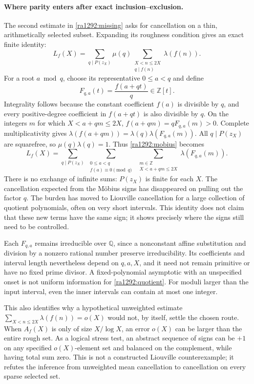 \documentclass[11pt]{article}
\newcommand{\Z}{\mathbb{Z}}
\newcommand{\Q}{\mathbb{Q}}
\begin{document}
\paragraph{Where parity enters after exact inclusion--exclusion.}
The second estimate in \eqref{ra1292:missing} asks for cancellation on a
thin, arithmetically selected subset. Expanding its roughness condition gives
an exact finite identity:
\begin{equation}\label{ra1292:mobius}
 L_f(X)=\sum_{q\mid P(z_X)}\mu(q)
           \sum_{\substack{X<n\le2X\\q\mid f(n)}}\lambda(f(n)).
\end{equation}
For a root $a\bmod q$, choose its representative $0\le a<q$ and define
\[
 F_{q,a}(t)=\frac{f(a+qt)}q\in\Z[t].
\]
Integrality follows because the constant coefficient $f(a)$ is divisible by
$q$, and every positive-degree coefficient in $f(a+qt)$ is also divisible
by $q$. On the integers $m$ for which $X<a+qm\le2X$,
$f(a+qm)=qF_{q,a}(m)>0$. Complete multiplicativity gives
$\lambda(f(a+qm))=\lambda(q)\lambda(F_{q,a}(m))$.
All $q\mid P(z_X)$ are squarefree, so $\mu(q)\lambda(q)=1$.
Thus \eqref{ra1292:mobius} becomes
\begin{equation}\label{ra1292:quotient}
 L_f(X)=
 \sum_{q\mid P(z_X)}
 \ \sum_{\substack{0\le a<q\\ f(a)\equiv0\pmod q}}
 \ \sum_{\substack{m\in\Z\\X<a+qm\le2X}}
        \lambda(F_{q,a}(m)).
\end{equation}
There is no exchange of infinite sums: $P(z_X)$ is finite for each $X$.
The cancellation expected from the M\"obius signs has disappeared on pulling
out the factor $q$. The burden has moved to Liouville cancellation for a
large collection of quotient polynomials, often on very short intervals.
This identity does not claim that these new terms have the same sign; it
shows precisely where the signs still need to be controlled.

Each $F_{q,a}$ remains irreducible over $\Q$, since a nonconstant affine
substitution and division by a nonzero rational number preserve
irreducibility. Its coefficients and interval length nevertheless depend on
$q,a,X$, and it need not remain primitive or have no fixed prime divisor.
A fixed-polynomial asymptotic with an unspecified onset is not uniform
information for \eqref{ra1292:quotient}. For moduli larger than the input
interval, even the inner intervals can contain at most one integer.

This also identifies why a hypothetical unweighted estimate
$\sum_{X<n\le2X}\lambda(f(n))=o(X)$ would not, by itself, settle the chosen
route. When $A_f(X)$ is only of size $X/\log X$, an error $o(X)$ can be larger
than the entire rough set. As a logical stress test, an abstract sequence of
signs can be $+1$ on any specified $o(X)$-element set and balanced on the
complement, while having total sum zero. This is not a constructed Liouville
counterexample; it refutes the inference from unweighted mean cancellation
to cancellation on every sparse selected set.
\end{document}
